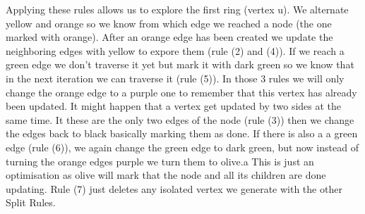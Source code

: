 \begin{center}
\end{center}

Applying these rules allows us to explore the first ring (vertex u).
We alternate yellow and orange so we know from which edge we reached a node (the one marked with orange).
After an orange edge has been created we update the neighboring edges with yellow to expore them (rule (2) and (4)).
If we reach a green edge we don't traverse it yet but mark it with dark green so we know that in the next iteration we can traverse it (rule (5)).
In those 3 rules we will only change the orange edge to a purple one to remember that this vertex has already been updated.
It might happen that a vertex get updated by two sides at the same time.
It these are the only two edges of the node (rule (3)) then we change the edges back to black basically marking them as done.
If there is also a a green edge (rule (6)), we again change the green edge to dark green, but now instead of turning the orange edges purple we turn them to olive.a
This is just an optimisation as olive will mark that the node and all its children are done updating.
Rule (7) just deletes any isolated vertex we generate with the other Split Rules.

